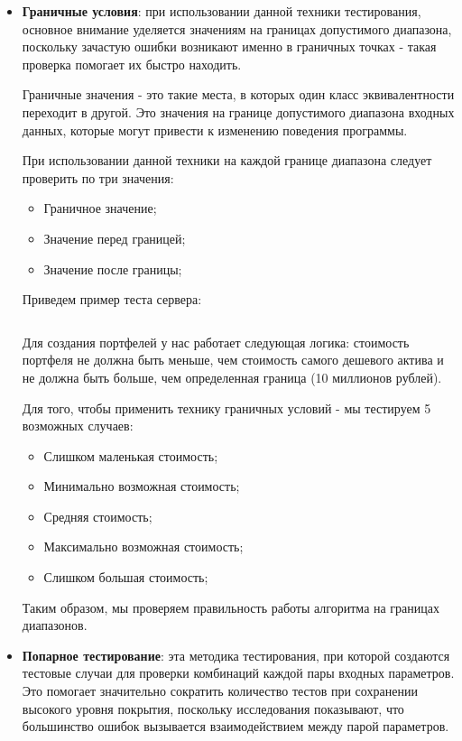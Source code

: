 \documentclass[a4paper, 14pt]{article}
\begin{document}
\begin{itemize}
    \item \textbf{Граничные условия}: при использовании данной техники тестирования, основное внимание уделяется значениям на границах допустимого диапазона, поскольку зачастую ошибки возникают именно в граничных точках - такая проверка помогает их быстро находить.

    Граничные значения - это такие места, в которых один класс эквивалентности переходит в другой. Это значения на границе допустимого диапазона входных данных, которые могут привести к изменению поведения программы.

    При использовании данной техники на каждой границе диапазона следует проверить по три значения:
    \begin{itemize}
        \item Граничное значение;
        \item Значение перед границей;
        \item Значение после границы;
    \end{itemize}

    Приведем пример теста сервера:
    \normalsize
    \inputminted[frame=single]{Java}{./code/2.java}
    \large

    Для создания портфелей у нас работает следующая логика: стоимость портфеля не должна быть меньше, чем стоимость самого дешевого актива и не должна быть больше, чем определенная граница (10 миллионов рублей).

    Для того, чтобы применить технику граничных условий - мы тестируем 5 возможных случаев:
    \begin{itemize}
        \item Слишком маленькая стоимость;
        \item Минимально возможная стоимость;
        \item Средняя стоимость;
        \item Максимально возможная стоимость;
        \item Слишком большая стоимость;
    \end{itemize}

    Таким образом, мы проверяем правильность работы алгоритма на границах диапазонов.

    \item \textbf{Попарное тестирование}: эта методика тестирования, при которой создаются тестовые случаи для проверки комбинаций каждой пары входных параметров. Это помогает значительно сократить количество тестов при сохранении высокого уровня покрытия, поскольку исследования показывают, что большинство ошибок вызывается взаимодействием между парой параметров.


\end{itemize}
\end{document}
